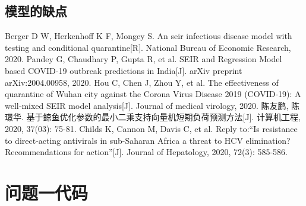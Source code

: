 \documentclass{whutmod}
\begin{document}
		\subsection{模型的缺点}

  
 
	\newpage	%
	\nocite{*}		%
	\begin{thebibliography}{9}%
		Berger D W, Herkenhoff K F, Mongey S. An seir infectious disease model with testing and conditional quarantine[R]. National Bureau of Economic Research, 2020.
	Pandey G, Chaudhary P, Gupta R, et al. SEIR and Regression Model based COVID-19 outbreak predictions in India[J]. arXiv preprint arXiv:2004.00958, 2020.
	Hou C, Chen J, Zhou Y, et al. The effectiveness of quarantine of Wuhan city against the Corona Virus Disease 2019 (COVID‐19): A well‐mixed SEIR model analysis[J]. Journal of medical virology, 2020.
	陈友鹏, 陈璟华. 基于鲸鱼优化参数的最小二乘支持向量机短期负荷预测方法[J]. 计算机工程, 2020, 37(03): 75-81.
	Childs K, Cannon M, Davis C, et al. Reply to:“Is resistance to direct-acting antivirals in sub-Saharan Africa a threat to HCV elimination? Recommendations for action”[J]. Journal of Hepatology, 2020, 72(3): 585-586.
	\end{thebibliography}

	\newpage
	\appendix %
	\section{问题一代码}
\end{document}
